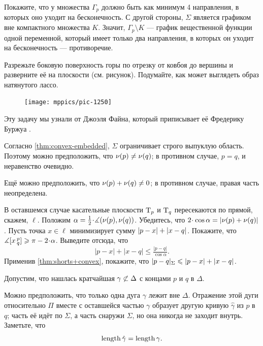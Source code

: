 \begin{multicols}{2}
Покажите, что у множества $\Gamma_p$ должно быть как минимум 4 направления, в которых оно уходит на бесконечность.
С другой стороны, $\Sigma$ является графиком вне компактного множества $K$.
Значит, $\Gamma_p\setminus K$ --- график вещественной функции одной переменной, который имеет только два направления, в которых он уходит на бесконечность --- противоречие.


\setcounter{eqtn}{0}

Разрежьте боковую поверхность горы по отрезку от ковбоя до вершины и
разверните её на плоскости (см. рисунок).
Подумайте, как может выглядеть образ натянутого лассо.

\begin{figure}
\vskip-4mm
\centering
\texttt{[image: mppics/pic-1250]}
\vskip-4mm
\end{figure}

Эту задачу мы узнали от Джоэля Файна, который приписывает её Фредерику Буржуа \cite{fine}.

Согласно \ref{thm:convex-embedded}, $\Sigma$ ограничивает строго выпуклую область.
Поэтому можно предположить, что $\nu(p)\ne\nu(q)$; в противном случае, $p=q$, и неравенство очевидно.

Ещё можно предположить, что $\Norm(p)\z+\Norm(q)\z\ne 0$; в противном случае, правая часть неопределена.

В оставшемся случае касательные плоскости $\mathrm{T}_p$ и $\mathrm{T}_q$ пересекаются по прямой, скажем, $\ell$.
Положим $\alpha=\tfrac12\cdot\measuredangle(\Norm(p),\Norm(q))$.
Убедитесь, что $2\cdot\cos\alpha\z= |\Norm(p)+\Norm(q)|$.
Пусть точка $x\in \ell$ минимизирует сумму $|p-x|\z+|x-q|$.
Покажите, что $\measuredangle\hinge xpq\ge \pi-2\cdot\alpha$.
Выведите отсюда, что 
\[
|p-x|+|x-q|\le \tfrac{|p-q|}{\cos\alpha}.
\]
Применив \ref{thm:shorts+convex}, покажите, что
$\dist{p}{q}\Sigma\z\le |p-x|\z+|x-q|$.

Допустим, что нашлась кратчайшая $\gamma\z{\not\subset}\Delta$ с концами $p$ и $q$ в $\Delta$.

Можно предположить, что только одна дуга $\gamma$ лежит вне $\Delta$.
Отражение этой дуги относительно $\Pi$ вместе с оставшейся частью $\gamma$ образует другую кривую $\hat\gamma$ из $p$ в $q$;
часть её идёт по $\Sigma$, 
а часть снаружи $\Sigma$,
но она никогда не заходит внутрь.
Заметьте, что
\[\mathop{\rm length}\nolimits\hat\gamma=\mathop{\rm length}\nolimits\gamma.\]


\end{multicols}
